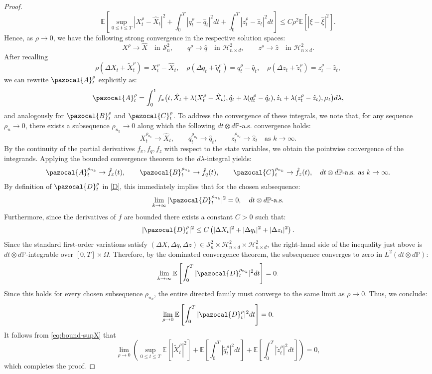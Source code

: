 \documentclass[11pt,a4paper]{article}
\newcommand{\Ab}{\pazocal{A}}
\newcommand{\Bb}{\pazocal{B}}
\newcommand{\Cb}{\pazocal{C}}
\newcommand{\Db}{\pazocal{D}}
\begin{document}
\begin{proof}
\[
\mathbb E\left[
\sup_{0\le t\le T}|X_t^\rho-\hat X_t|^2
+\int_0^T|q_t^\rho-\hat q_t|^2dt
+\int_0^T|z_t^\rho-\hat z_t|^2dt
\right]
\le
C\rho^2\mathbb E\left[|\xi-\hat\xi|^2\right].
\]
Hence, as $\rho\to0$, we have the following strong convergence in the respective solution spaces:
\[
X^\rho\to \hat X \quad \text{in } \mathcal S^2_n, \qquad
q^\rho\to \hat q \quad \text{in } \mathcal H^2_{n \times d}, \qquad
z^\rho\to \hat z \quad \text{in } \mathcal H^2_{n \times d}.
\]
After recalling
\[
\rho(\Delta X_t+\tilde X_t^\rho)=X_t^\rho-\hat X_t, \quad
\rho(\Delta q_t+\tilde q_t^\rho)=q_t^\rho-\hat q_t, \quad
\rho(\Delta z_t+\tilde z_t^\rho)=z_t^\rho-\hat z_t,
\] 
we can rewrite $\Ab_t ^\rho$ explicitly as:
\[
\Ab_t^\rho
=
\int_0^1
f_x\bigl(
t,
\hat X_t+\lambda(X_t^\rho-\hat X_t),
\hat q_t+\lambda(q_t^\rho-\hat q_t),
\hat z_t+\lambda(z_t^\rho-\hat z_t),
\mu_t
\bigr)d\lambda,
\]
and analogously for $\Bb_t^\rho$ and $\Cb_t^\rho$. 
To address the convergence of these integrals, we note that, for any sequence $\rho_n \to 0$, there exists a subsequence $\rho_{n_k} \to 0$ along which the following $dt \otimes d\mathbb{P}$-a.s. convergence holds:
\[
X_t^{\rho_{n_k}}\to \hat X_t, \qquad q_t^{\rho_{n_k}}\to \hat q_t, \qquad z_t^{\rho_{n_k}}\to \hat z_t \quad \text{as } k\to\infty.
\]
By the continuity of the partial derivatives $f_x, f_q, f_z$ with respect to the state variables, we obtain the pointwise convergence of the integrands. Applying the bounded convergence theorem to the $d\lambda$-integral yields:
\[
\Ab_t^{\rho_{n_k}}\to \hat f_x(t),\qquad
\Bb_t^{\rho_{n_k}}\to \hat f_q(t),\qquad
\Cb_t^{\rho_{n_k}}\to \hat f_z(t),
\quad dt \otimes d\mathbb{P}\text{-a.s. as } k\to\infty.
\]
By definition of $\Db_t^\rho$ in \eqref{D}, this immediately implies that for the chosen subsequence:
\[
\lim_{k\to\infty} |\Db_t^{\rho_{n_k}}|^2 = 0, \quad dt \otimes d\mathbb{P}\text{-a.s.}
\]
Furthermore, since the derivatives of $f$ are  bounded there exists a constant $C >0$ such that:
\[
|\Db_t^\rho|^2
\le C\left( |\Delta X_t|^2+|\Delta q_t|^2+|\Delta z_t|^2\right).
\]
Since the standard first-order variations satisfy $(\Delta X,\Delta q,\Delta z) \in \mathcal S_n^2 \times \mathcal H_{n\times d}^2 \times \mathcal H_{n\times d}^2$, the right-hand side of the inequality just above is $dt \otimes d\mathbb P$-integrable over $[0,T] \times \Omega$. 
Therefore, by the dominated convergence theorem, the subsequence converges to zero in $L^2(dt \otimes d\mathbb{P})$:
\[
\lim_{k\to\infty} \mathbb E\left[\int_0^T |\Db_t^{\rho_{n_k}}|^2dt\right] = 0.
\]
Since this holds for every chosen subsequence $\rho_{n_k}$, the entire directed family must converge to the same limit as $\rho \to 0$. Thus, we conclude:
\[
\lim_{\rho\to0}
\mathbb E\left[\int_0^T |\Db_t^\rho|^2dt\right]
=0.
\]
It follows from \eqref{eq:bound-supX} that
\[
\lim_{\rho\to0} \left( \sup_{0\le t\le T}\mathbb E\left[|\tilde X_t^\rho|^2\right] + \mathbb E\left[\int_0^T|\tilde q_t^\rho|^2dt\right]
+ \mathbb E\left[\int_0^T|\tilde z_t^\rho|^2dt\right]
\right) =0,
\]
which completes the proof.
\end{proof}
\end{document}
